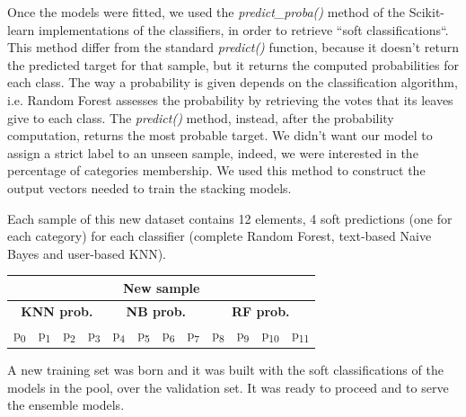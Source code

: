 Once the models were fitted, we used the \textit{predict\_proba()} method of the Scikit-learn implementations of the classifiers, in order to retrieve ``soft classifications``. This method differ from the standard \textit{predict()} function, because it doesn't return the predicted target for that sample, but it returns the computed probabilities for each class. The way a probability is given depends on the classification algorithm, i.e. Random Forest assesses the probability by retrieving the votes that its leaves give to each class. The \textit{predict()} method, instead, after the probability computation, returns the most probable target.
We didn't want our model to assign a strict label to an unseen sample, indeed, we were interested in the percentage of categories membership.
We used this method to construct the output vectors needed to train the stacking models.

Each sample of this new dataset contains 12 elements, 4 soft predictions (one for each category) for each classifier (complete Random Forest, text-based Naive Bayes and user-based KNN).

\begin{center}
	\begin{tabular}{@{}c|c|c|c|c|c|c|c|c|c|c|c@{}}
		\multicolumn{12}{c}{New sample} \\
		\hline
		\multicolumn{4}{c|}{\textbf{KNN prob.}} & 
		\multicolumn{4}{c|}{\textbf{NB prob.}} & 
		\multicolumn{4}{c}{\textbf{RF prob.}}\\
		\hline
		\multicolumn{1}{c|}{p\textsubscript{0}} &
		\multicolumn{1}{c|}{p\textsubscript{1}} &
		\multicolumn{1}{c|}{p\textsubscript{2}} &
		\multicolumn{1}{c|}{p\textsubscript{3}} &
		\multicolumn{1}{c|}{p\textsubscript{4}} &
		\multicolumn{1}{c|}{p\textsubscript{5}} &
		\multicolumn{1}{c|}{p\textsubscript{6}} &
		\multicolumn{1}{c|}{p\textsubscript{7}} &	
		\multicolumn{1}{c|}{p\textsubscript{8}} &
		\multicolumn{1}{c|}{p\textsubscript{9}} &
		\multicolumn{1}{c|}{p\textsubscript{10}} &
		\multicolumn{1}{c}{p\textsubscript{11}}\\
		\hline
	\end{tabular}
\end{center}

A new training set was born and it was built with the soft classifications of the models in the pool, over the validation set. It was ready to proceed and to serve the ensemble models.\\

